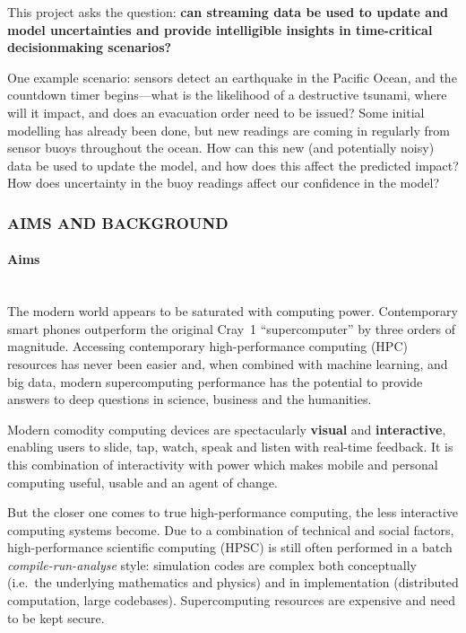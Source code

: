 \documentclass[a4paper,fontsize=12pt]{scrartcl}
\begin{document}
This project asks the question: \textbf{can streaming data be used to
  update and model uncertainties and provide intelligible insights in
  time-critical decisionmaking scenarios?}

One example scenario: sensors detect an earthquake in the Pacific Ocean,
and the countdown timer begins---what is the likelihood of a
destructive tsunami, where will it impact, and does an evacuation
order need to be issued? Some initial modelling has already been done,
but new readings are coming in regularly from sensor buoys throughout
the ocean. How can this new (and potentially noisy) data be used to
update the model, and how does this affect the predicted impact? How
does uncertainty in the buoy readings affect our confidence in the
model?


\subsubsection*{AIMS AND BACKGROUND}
\label{SWfMS-grant}
\paragraph*{Aims}\mbox{}\\

The modern world appears to be saturated with computing power.
Contemporary smart phones outperform the original Cray~1
``supercomputer'' by three orders of magnitude. Accessing contemporary
high-performance computing (HPC) resources has never been easier and,
when combined with machine learning\parencite{Hastie2009}, and big
data\parencite{Manyika2011}, modern supercomputing performance has the
potential to provide answers to deep questions in science, business
and the humanities.

Modern comodity computing devices are spectacularly \textbf{visual}
and \textbf{interactive}, enabling users to slide, tap, watch, speak
and listen with real-time feedback. It is this combination of
interactivity with power which makes mobile and personal computing
useful, usable and an agent of change.

But the closer one comes to true high-performance computing, the less
interactive computing systems become. Due to a combination of
technical and social factors, high-performance scientific computing
(HPSC) is still often performed in a batch \emph{compile-run-analyse}
style: simulation codes are complex both conceptually (i.e.~the
underlying mathematics and physics) and in implementation (distributed
computation, large codebases). Supercomputing resources are expensive
and need to be kept secure.
\end{document}
